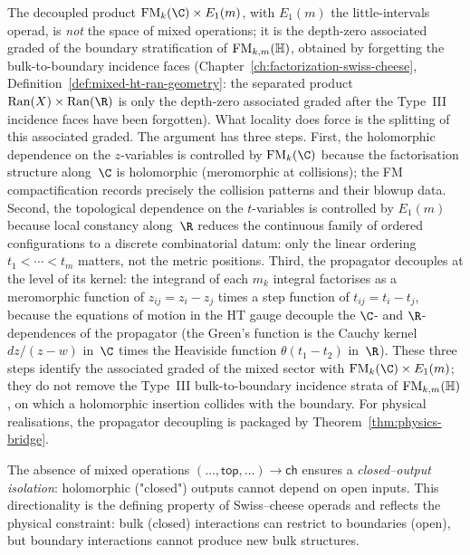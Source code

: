 \begin{remark}
\label{rem:product-forced-by-locality}
The decoupled product $\FM_k(\C) \times E_1(m)$, with $E_1(m)$ the
little-intervals operad, is \emph{not} the space of mixed
operations; it is the depth-zero associated graded of the boundary
stratification of $\mathrm{FM}_{k,m}(\mathbb H)$, obtained by forgetting
the bulk-to-boundary incidence faces
(Chapter~\ref{ch:factorization-swiss-cheese},
Definition~\ref{def:mixed-ht-ran-geometry}: the separated product
$\Ran(X)\times\Ran(\R)$ is only the depth-zero associated graded
after the Type~III incidence faces have been forgotten). What
locality does force is the splitting of this associated graded.
The argument has three steps.
First, the holomorphic dependence on the $z$-variables is
controlled by $\FM_k(\C)$ because the factorisation structure
along~$\C$ is holomorphic (meromorphic at collisions); the
FM compactification records precisely the collision patterns and
their blowup data. Second, the topological dependence on the
$t$-variables is controlled by $E_1(m)$ because local constancy
along~$\R$ reduces the continuous family of ordered
configurations to a discrete combinatorial datum: only the
linear ordering $t_1 < \cdots < t_m$ matters, not the metric
positions. Third, the propagator decouples at the level of its
kernel: the integrand of each $m_k$ integral
factorises as a meromorphic function of $z_{ij} = z_i - z_j$ times
a step function of $t_{ij} = t_i - t_j$, because the equations of
motion in the HT gauge decouple the $\C$- and $\R$-dependences
of the propagator (the Green's function is the Cauchy kernel
$dz/(z-w)$ in~$\C$ times the Heaviside function
$\theta(t_1 - t_2)$ in~$\R$). These three steps identify the
associated graded of the mixed sector with
$\FM_k(\C) \times E_1(m)$; they do not remove the Type~III
bulk-to-boundary incidence strata of $\mathrm{FM}_{k,m}(\mathbb H)$, on
which a holomorphic insertion collides with the boundary. For
physical realisations, the propagator
decoupling is packaged by Theorem~\ref{thm:physics-bridge}.
\end{remark}

\begin{remark}
The absence of mixed operations $(\ldots,\mathsf{top},\ldots)\to\mathsf{ch}$ ensures a
\emph{closed--output isolation}: holomorphic ("closed") outputs cannot depend on open inputs.
This directionality is the defining property of Swiss--cheese operads and reflects the physical constraint:
bulk (closed) interactions can restrict to boundaries (open), but boundary interactions
cannot produce new bulk structures.
\end{remark}

